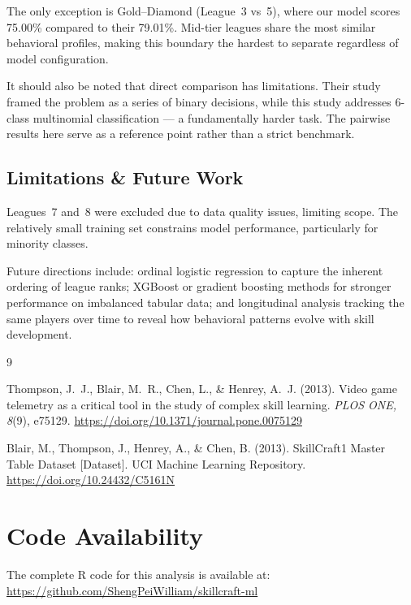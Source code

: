 \documentclass[12pt, a4paper]{article}
\begin{document}
The only exception is Gold--Diamond (League~3 vs~5), where our model scores 75.00\%
compared to their 79.01\%. Mid-tier leagues share the most similar behavioral profiles,
making this boundary the hardest to separate regardless of model configuration.

It should also be noted that direct comparison has limitations. Their study framed
the problem as a series of binary decisions, while this study addresses 6-class
multinomial classification --- a fundamentally harder task. The pairwise results here
serve as a reference point rather than a strict benchmark.

\subsection{Limitations \& Future Work}

Leagues~7 and~8 were excluded due to data quality issues, limiting scope. The relatively
small training set constrains model performance, particularly for minority classes.

Future directions include: ordinal logistic regression to capture the inherent ordering of
league ranks; XGBoost or gradient boosting methods for stronger performance on imbalanced
tabular data; and longitudinal analysis tracking the same players over time to reveal how
behavioral patterns evolve with skill development.



\begin{thebibliography}{9}

Thompson, J.~J., Blair, M.~R., Chen, L., \& Henrey, A.~J. (2013).
Video game telemetry as a critical tool in the study of complex skill learning.
\textit{PLOS ONE, 8}(9), e75129.
\url{https://doi.org/10.1371/journal.pone.0075129}

Blair, M., Thompson, J., Henrey, A., \& Chen, B. (2013).
SkillCraft1 Master Table Dataset [Dataset].
UCI Machine Learning Repository.
\url{https://doi.org/10.24432/C5161N}

\end{thebibliography}


\appendix
\section{Code Availability}

The complete R code for this analysis is available at:\\
\url{https://github.com/ShengPeiWilliam/skillcraft-ml}
\end{document}

